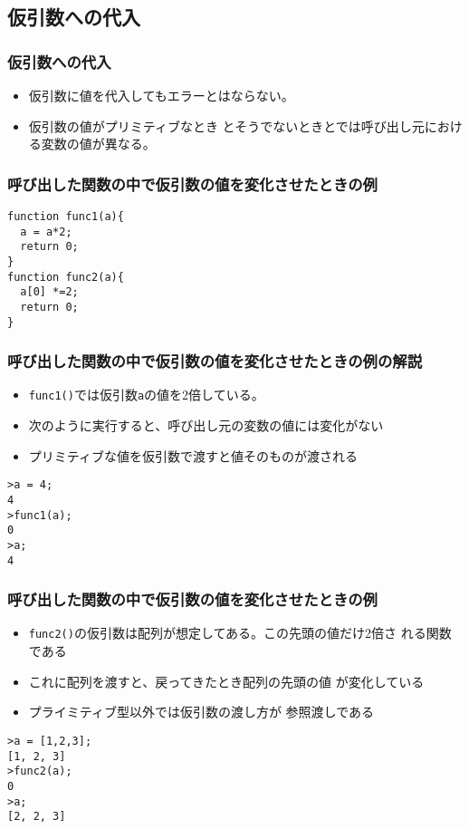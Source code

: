 \subsection{仮引数への代入}
\begin{frame}[containsverbatim]
\frametitle{仮引数への代入}
\begin{itemize}
 \item 仮引数に値を代入してもエラーとはならない。
 \item 仮引数の値がプリミティブなとき
とそうでないときとでは呼び出し元における変数の値が異なる。
\end{itemize}
\end{frame}
\begin{frame}[containsverbatim]
\frametitle{呼び出した関数の中で仮引数の値を変化させたときの例}
\begin{Verbatim}
function func1(a){
  a = a*2;
  return 0;
}
function func2(a){
  a[0] *=2;
  return 0;
}
\end{Verbatim}
\end{frame}
\begin{frame}[containsverbatim]
\frametitle{ 呼び出した関数の中で仮引数の値を変化させたときの例の解説}
\begin{itemize}
 \item  \Verb+func1()+では仮引数\Verb+a+の値を2倍している。
 \item 次のように実行すると、呼び出し元の変数の値には変化がない
 \item プリミティブな値を仮引数で渡すと値そのものが渡される
\end{itemize}
\begin{Verbatim}
>a = 4;
4
>func1(a);
0
>a;
4
\end{Verbatim}
\end{frame}
\begin{frame}[containsverbatim]
\frametitle{ 呼び出した関数の中で仮引数の値を変化させたときの例}
\begin{itemize}
 \item \Verb+func2()+の仮引数は配列が想定してある。この先頭の値だけ2倍さ
       れる関数である
 \item これに配列を渡すと、戻ってきたとき配列の先頭の値
       が変化している
 \item プライミティブ型以外では仮引数の渡し方が
       参照渡しである
\end{itemize}
\begin{Verbatim}
>a = [1,2,3];
[1, 2, 3]
>func2(a);
0
>a;
[2, 2, 3]
\end{Verbatim}
\end{frame}
